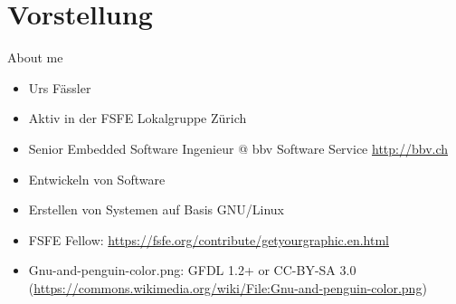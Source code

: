 
\section{Vorstellung}
\begin{frame}{About me}
	\begin{center}
	\end{center}
\end{frame}
\note
{
	\begin{itemize}
		\item Urs Fässler
		\item Aktiv in der FSFE Lokalgruppe Zürich
		\item Senior Embedded Software Ingenieur @ bbv Software Service \url{http://bbv.ch}
		\item Entwickeln von Software
		\item Erstellen von Systemen auf Basis GNU/Linux
		\item FSFE Fellow: \url{https://fsfe.org/contribute/getyourgraphic.en.html}
		\item Gnu-and-penguin-color.png: GFDL 1.2+ or CC-BY-SA 3.0 (\url{https://commons.wikimedia.org/wiki/File:Gnu-and-penguin-color.png})
	\end{itemize}
}

